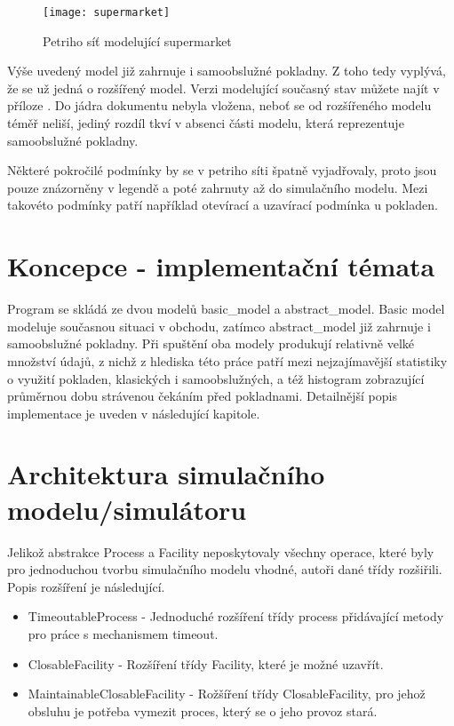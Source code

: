 \documentclass[12pt,a4paper,titlepage]{article}
\begin{document}
\begin{figure}[h]
\centering
\texttt{[image: supermarket]}
\caption{Petriho síť modelující supermarket}
\end{figure}


Výše uvedený model již zahrnuje i samoobslužné pokladny. Z toho tedy vyplývá, že se už jedná o rozšířený model. Verzi modelující současný stav můžete najít v příloze . Do jádra dokumentu nebyla vložena, neboť se od rozšířeného modelu téměř neliší, jediný rozdíl tkví v absenci části modelu, která reprezentuje samoobslužné pokladny. 

Některé pokročilé podmínky by se v petriho síti špatně vyjadřovaly, proto jsou pouze znázorněny v legendě a poté zahrnuty až do simulačního modelu. Mezi takovéto podmínky patří například otevírací a uzavírací podmínka u pokladen.

\section{Koncepce - implementační témata}

Program se skládá ze dvou modelů basic_model a abstract_model. Basic model modeluje současnou situaci v obchodu, zatímco abstract_model již zahrnuje i samoobslužné pokladny. Při spuštění oba modely produkují relativně velké množství údajů, z nichž z hlediska této práce patří mezi nejzajímavější statistiky o využití pokladen, klasických i samoobslužných, a též histogram zobrazující průměrnou dobu strávenou čekáním před pokladnami. Detailnější popis implementace je uveden v následující kapitole. 

\section{Architektura simulačního modelu/simulátoru}

Jelikož abstrakce Process a Facility neposkytovaly všechny operace, které byly pro jednoduchou tvorbu simulačního modelu vhodné, autoři dané třídy rozšiřili. Popis rozšíření je následující. 

\begin{itemize}
\item TimeoutableProcess  - Jednoduché rozšíření třídy process přidávající metody pro práce s mechanismem timeout.
\item ClosableFacility -  Rozšíření třídy Facility, které je možné uzavřít. 
\item MaintainableClosableFacility - Rožšíření třídy ClosableFacility, pro jehož obsluhu je potřeba vymezit proces, který se o jeho provoz stará. 
\end{itemize}
\end{document}
